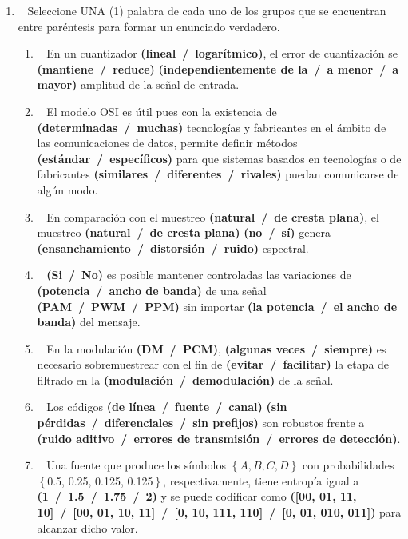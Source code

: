 \begin{enumerate}
\begin{enumerate}
		\item~ Seleccione UNA (1) palabra de cada uno de los grupos que se encuentran entre paréntesis para formar un enunciado verdadero.
		\begin{enumerate}
			\item~ En un cuantizador \textbf{(lineal~/~logarítmico)}, el error de cuantización se \textbf{(mantiene~/~reduce)} \textbf{(independientemente de la~/~a menor~/~a mayor)} amplitud de la señal de entrada.
			
			\item~ El modelo OSI es útil pues con la existencia de \textbf{(determinadas~/~muchas)} tecnologías y fabricantes en el ámbito de las comunicaciones de datos, permite definir métodos \textbf{(estándar~/~específicos)} para que sistemas basados en tecnologías o de fabricantes \textbf{(similares~/~diferentes~/~rivales)} puedan comunicarse de algún modo. 
			
			\item~ En comparación con el muestreo \textbf{(natural~/~de cresta plana)}, el muestreo \textbf{(natural~/~de cresta plana)} \textbf{(no~/~sí)} genera \textbf{(ensanchamiento~/~distorsión~/~ruido)} espectral.
			
			\item~ \textbf{(Si~/~No)} es posible mantener controladas las variaciones de \textbf{(potencia~/~ancho de banda)} de una señal \textbf{(PAM~/~PWM~/~PPM)} sin importar \textbf{(la potencia~/~el ancho de banda)} del mensaje.
			
			\item~ En la modulación \textbf{(DM~/~PCM)}, \textbf{(algunas veces~/~siempre)} es necesario sobremuestrear con el fin de \textbf{(evitar~/~facilitar)} la etapa de filtrado en la \textbf{(modulación~/~demodulación)} de la señal. 
			
			\item~ Los códigos \textbf{(de línea~/~fuente~/~canal)} \textbf{(sin pérdidas~/~diferenciales~/~sin prefijos)} son robustos frente a \textbf{(ruido aditivo~/~errores de transmisión~/~errores de detección)}.
			
			\item~ Una fuente que produce los símbolos $\left\lbrace A, B, C, D \right\rbrace$ con probabilidades $\left\lbrace \right.$0.5, 0.25, 0.125, 0.125$\left. \right\rbrace$, respectivamente, tiene entropía igual a \textbf{(1~/~1.5~/~1.75~/~2)} y se puede codificar como 
			\textbf{([00, 01, 11, 10]~/~[00, 01, 10, 11]~/~[0, 10, 111, 110]~/~[0, 01, 010, 011])} para alcanzar dicho valor.
			

\end{enumerate}
\end{enumerate}
\end{enumerate}
